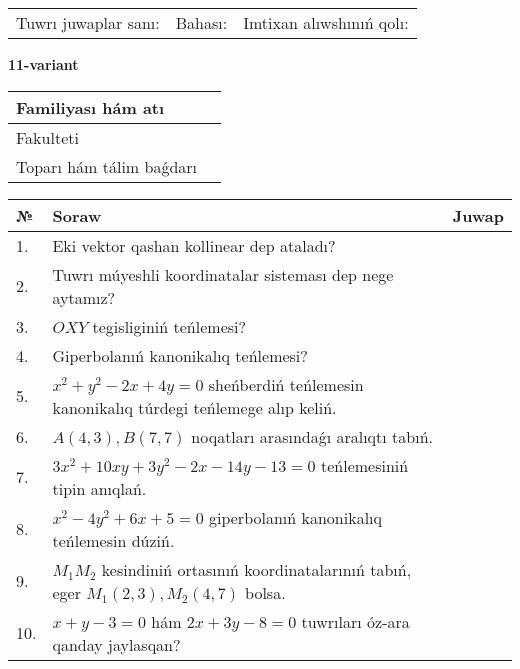 \documentclass{article}
\begin{document}
\vspace{1cm}

\begin{tabular}{lll}
Tuwrı juwaplar sanı: \underline{\hspace{1.5cm}} & 
Bahası: \underline{\hspace{1.5cm}} & 
Imtixan alıwshınıń qolı: \underline{\hspace{2cm}} \\
\end{tabular}

\egroup

\newpage


\textbf{11-variant}\\

\bgroup
\def\arraystretch{1.6} %

\begin{tabular}{|m{5.7cm}|m{9.5cm}|}
\hline
Familiyası hám atı & \\
\hline
Fakulteti  & \\
\hline
Toparı hám tálim baǵdarı  & \\
\hline
\end{tabular}

\vspace{1cm}

\begin{tabular}{|m{0.7cm}|m{10cm}|m{4cm}|}
\hline
№ & Soraw & Juwap \\
\hline
1. & Eki vektor qashan kollinear dep ataladı? &  \\
\hline
2. & Tuwrı múyeshli koordinatalar sisteması dep nege aytamız? &  \\
\hline
3. & $OXY$ tegisliginiń teńlemesi? &  \\
\hline
4. & Giperbolanıń kanonikalıq teńlemesi? &  \\
\hline
5. & $x^{2}+y^{2}-2x+4y=0$ sheńberdiń teńlemesin kanonikalıq túrdegi teńlemege alıp keliń. &  \\
\hline
6. & $A(4, 3), B(7, 7)$ noqatları arasındaǵı aralıqtı tabıń. &  \\
\hline
7. & $3x^{2}+10xy+3y^{2}-2x-14y-13=0$ teńlemesiniń tipin anıqlań. &  \\
\hline
8. & $x^{2}-4y^{2}+6x+5=0$ giperbolanıń kanonikalıq teńlemesin dúziń. &  \\
\hline
9. & $M_{1}M_{2}$ kesindiniń ortasınıń koordinatalarınıń tabıń, eger $M_{1} (2, 3), M_{2} (4, 7)$ bolsa. &  \\
\hline
10. & $x+y-3=0$ hám $2x+3y-8=0$ tuwrıları óz-ara qanday jaylasqan? &  \\
\hline
\end{tabular}
\end{document}
